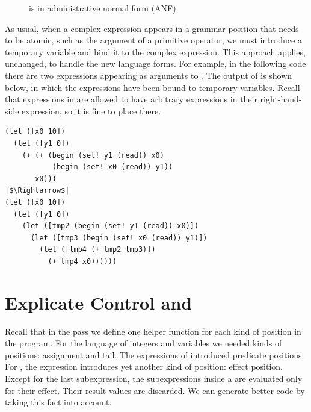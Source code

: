 \documentclass[11pt]{book}
\newcommand{\gray}[1]{{\color{gray} #1}}
\newcommand{\ocaml}[1]{{\color{blue}{#1}}}
\begin{document}
\begin{figure}[tp]
\centering
\fbox{
\begin{minipage}{0.96\textwidth}
\small
\[
\begin{array}{rcl}
\Atm &::=& \gray{ \INT{\Int} \mid \VAR{\Var} \mid \BOOL{\itm{bool}}
       \mid \VOID{} } \\
\Exp &::=& \ldots \mid \gray{ \LET{\Var}{\Exp}{\Exp} } \\
    &\mid& \WHILE{\Exp}{\Exp} \mid \SETBANG{\Var}{\Exp}
   \mid \BEGIN{\LP\Exp\ldots\RP}{\Exp} \\
\Def &::=& \gray{ \FUNDEF{\Var}{([\Var \code{:} \Type]\ldots)}{\Type}{\code{'()}}{\Exp} }\\
R^{\dagger}_8  &::=& \gray{ \PROGRAMDEFS{\code{'()}}{\Def} }
\end{array}
\]
\end{minipage}
}
\caption{\LangLoopANF{} is \LangLoop{} in administrative normal form (ANF).}
\label{fig:Rwhile-anf-syntax}
\end{figure}

As usual, when a complex expression appears in a grammar position that
needs to be atomic, such as the argument of a primitive operator, we
must introduce a temporary variable and bind it to the complex
expression.  This approach applies, unchanged, to handle the new
language forms.  For example, in the following code there are two
 expressions appearing as arguments to \code{+}.  The
output of  is shown below, in which the 
expressions have been bound to temporary variables. Recall that
 expressions in \LangLoopANF{} are allowed to have
arbitrary expressions in their right-hand-side expression, so it is
fine to place  there.

\begin{lstlisting}
(let ([x0 10])
  (let ([y1 0])
    (+ (+ (begin (set! y1 (read)) x0)
           (begin (set! x0 (read)) y1))
       x0)))
|$\Rightarrow$|
(let ([x0 10])
  (let ([y1 0])
    (let ([tmp2 (begin (set! y1 (read)) x0)])
      (let ([tmp3 (begin (set! x0 (read)) y1)])
        (let ([tmp4 (+ tmp2 tmp3)])
          (+ tmp4 x0))))))
\end{lstlisting}

\section{Explicate Control and \LangCLoop{}}
\label{sec:explicate-loop}

Recall that in the  pass we define one helper
function for each kind of position in the program.  For the \LangVar{}
language of integers and variables we needed \ocaml{two} kinds of positions:
assignment and tail. The  expressions of \LangIf{} introduced
predicate positions. For \LangLoop{}, the  expression introduces
yet another kind of position: effect position. Except for the last
subexpression, the subexpressions inside a  are evaluated
only for their effect. Their result values are discarded. We can
generate better code by taking this fact into account.
\end{document}
